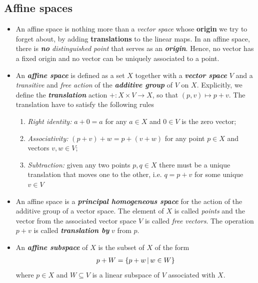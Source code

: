 \documentclass[11pt]{article}
\begin{document}
\subsection{Affine spaces}
\begin{itemize}
\item An affine space is nothing more than a \emph{vector space} whose \textbf{origin} we try to forget about, by adding \textbf{translations} to the linear maps.  In an affine space, there is \emph{\textbf{no} distinguished point} that serves as an \emph{\textbf{origin}}.  Hence, no vector has a fixed origin and no vector can be uniquely associated to a point.

\item \begin{definition}
 An \emph{\textbf{affine space}} is defined as a set $X$ together with a \emph{\textbf{vector space}} $V$  and a \emph{transitive} and \emph{free action} of the \emph{\textbf{additive group}} of $V$ on $X$. Explicitly, we define the \emph{\textbf{translation}} action $+: X \times V \rightarrow X$, so that $(p,v) \mapsto p + v$.  The translation  have to satisfy the following rules
 \begin{enumerate}
 \item \emph{Right identity:} $a + 0 = a$ for any $a\in X$ and $0 \in V$ is the zero vector;
 \item \emph{Associativity:} $(p+ v) + w = p+ (v + w)$ for any point $p\in X$ and vectors $v, w \in V$;
 \item \emph{Subtraction:} given any two points $p, q \in X$ there must be a unique translation that moves one to the other, i.e. $q = p +  v$ for some unique $v \in V$
 \end{enumerate}
 \end{definition}
 
\item An affine space is a \emph{\textbf{principal homogeneous space}} for the action of the additive group of a vector space. The element of $X$ is called \emph{points} and the vector from the associated vector space $V$ is called \emph{free vectors}. The operation $p+v$ is called \emph{\textbf{translation by}} $v$ from $p$.
 
\item \begin{definition}
An \emph{\textbf{affine subspace}} of  $X$ is the subset of $X$ of the form 
 \begin{align*}
p + W =  \left\{p + w \,|\, w \in W\right\}
 \end{align*} where $p\in X$ and $W \subseteq V$ is a linear subspace of $V$ associated with $X$.
 \end{definition}
 

\end{itemize}
\end{document}
